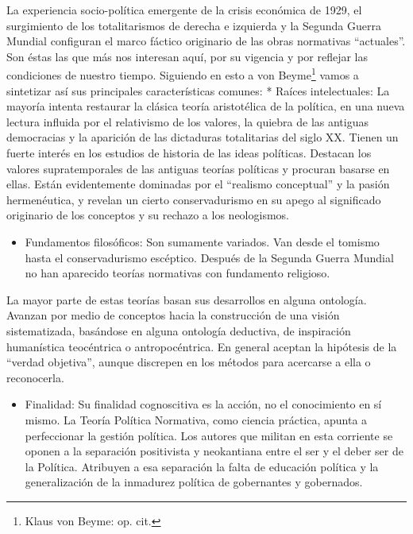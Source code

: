 \documentclass[
]{book}
\providecommand{\tightlist}{%
  \setlength{\itemsep}{0pt}\setlength{\parskip}{0pt}}
\begin{document}
La experiencia socio-política emergente de la crisis económica de 1929, el surgimiento de los totalitarismos de derecha e izquierda y la Segunda Guerra Mundial configuran el marco fáctico originario de las obras normativas ``actuales''. Son éstas las que más nos interesan aquí, por su vigencia y por reflejar las condiciones de nuestro tiempo. Siguiendo en esto a von Beyme\footnote{Klaus von Beyme: op. cit.} vamos a sintetizar así sus principales características comunes: * Raíces intelectuales: La mayoría intenta restaurar la clásica teoría aristotélica de la política, en una nueva lectura influida por el relativismo de los valores, la quiebra de las antiguas democracias y la aparición de las dictaduras totalitarias del siglo XX. Tienen un fuerte interés en los estudios de historia de las ideas políticas. Destacan los valores supratemporales de las antiguas teorías políticas y procuran basarse en ellas. Están evidentemente dominadas por el ``realismo conceptual'' y la pasión hermenéutica, y revelan un cierto conservadurismo en su apego al significado originario de los conceptos y su rechazo a los neologismos.

\begin{itemize}
\tightlist
\item
  Fundamentos filosóficos: Son sumamente variados. Van desde el tomismo hasta el conservadurismo escéptico. Después de la Segunda Guerra Mundial no han aparecido teorías normativas con fundamento religioso.
\end{itemize}

La mayor parte de estas teorías basan sus desarrollos en alguna ontología. Avanzan por medio de conceptos hacia la construcción de una visión sistematizada, basándose en alguna ontología deductiva, de inspiración humanística teocéntrica o antropocéntrica. En general aceptan la hipótesis de la ``verdad objetiva'', aunque discrepen en los métodos para acercarse a ella o reconocerla.

\begin{itemize}
\tightlist
\item
  Finalidad: Su finalidad cognoscitiva es la acción, no el conocimiento en sí mismo. La Teoría Política Normativa, como ciencia práctica, apunta a perfeccionar la gestión política. Los autores que militan en esta corriente se oponen a la separación positivista y neokantiana entre el ser y el deber ser de la Política. Atribuyen a esa separación la falta de educación política y la generalización de la inmadurez política de gobernantes y gobernados.
\end{itemize}
\end{document}
